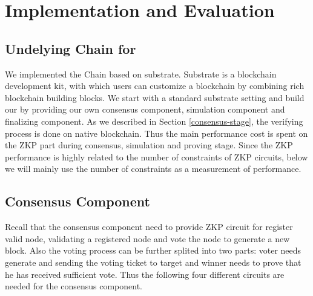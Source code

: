 \section{Implementation and Evaluation}
\label{chp:bench}
\subsection{Undelying Chain for \dprotocol}
We implemented the Chain based on substrate. Substrate is a blockchain development kit, with which users can customize a blockchain by combining rich blockchain building blocks. We start with a standard substrate setting and build our \dprotocol by providing our own consensus component, simulation component and finalizing component. As we described in Section \ref{consensus-stage}, the verifying process is done on native blockchain. Thus the main performance cost is spent on the ZKP part during consensus, simulation and proving stage. Since the ZKP performance is highly related to the number of constraints of ZKP circuits, below we will mainly use the number of constraints as a measurement of performance. 

\subsection {Consensus Component}
Recall that the consensus component need to provide ZKP circuit for register valid node, validating a registered node and vote the node to generate a new block. Also the voting process can be further splited into two parts: voter needs generate and sending the voting ticket to target and winner needs to prove that he has received sufficient vote.  Thus the following four different circuits are needed for the consensus component.

